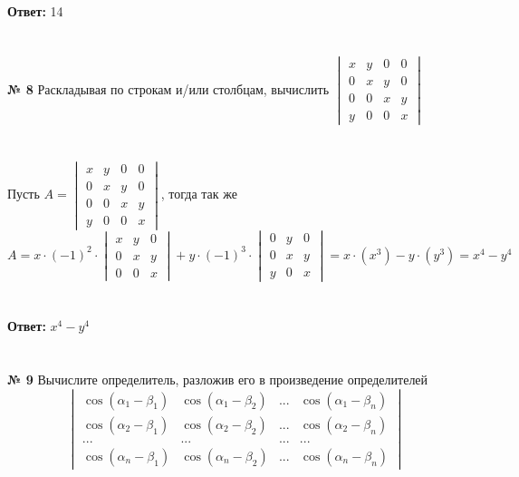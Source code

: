 \documentclass[a4paper, 12pt]{article}
\begin{document}
    \\
    \\ \textbf{Ответ: } 14
    \\
    \\
    \\ \textbf{№ 8} Раскладывая по строкам и/или столбцам, вычислить $\begin{vmatrix} x & y & 0 & 0 \\ 0 & x & y & 0 \\ 0 & 0 & x & y \\ y & 0 & 0 & x \end{vmatrix}$
    \\
    \\
    \\ Пусть $A = \begin{vmatrix} x & y & 0 & 0 \\ 0 & x & y & 0 \\ 0 & 0 & x & y \\ y & 0 & 0 & x \end{vmatrix}$, тогда так же $A = x \cdot (-1)^{2} \cdot \begin{vmatrix} x & y & 0 \\ 0 & x & y \\ 0 & 0 & x \end{vmatrix} + y \cdot (-1)^3 \cdot \begin{vmatrix} 0 & y & 0 \\ 0 & x & y \\ y & 0 & x \end{vmatrix} = x \cdot (x^3) - y \cdot (y^3) = x^4 - y^4$
    \\
    \\
    \\ \textbf{Ответ: } $x^4 - y^4$
    \\
    \\
    \\ \textbf{№ 9} Вычислите определитель, разложив его в произведение определителей
    \\
    \[
        \begin{vmatrix}\cos (\alpha_1 - \beta_1) & \cos (\alpha_1 - \beta_2) & ... & \cos (\alpha_1 - \beta_n) \\ \cos (\alpha_2 - \beta_1) & \cos (\alpha_2 - \beta_2) & ... & \cos (\alpha_2 - \beta_n) \\ ... & ... & ... & ... \\ \cos (\alpha_n - \beta_1) & \cos (\alpha_n - \beta_2) & ... & \cos (\alpha_n - \beta_n)\end{vmatrix}
    \]
\end{document}
